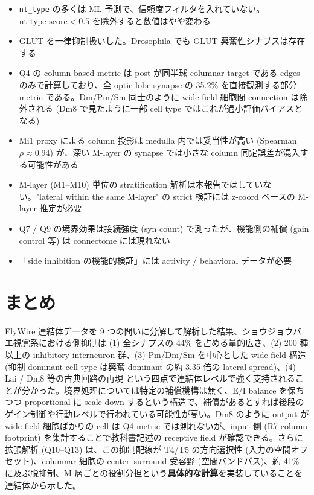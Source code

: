 \documentclass[11pt,a4paper]{ltjsarticle}
\begin{document}
\begin{itemize}
\item \texttt{nt\_type} の多くは ML 予測で、信頼度フィルタを入れていない。$\text{nt\_type\_score} < 0.5$ を除外すると数値はやや変わる
\item GLUT を一律抑制扱いした。Drosophila でも GLUT 興奮性シナプスは存在する
\item Q4 の column-based metric は post が同半球 columnar target である edges のみで計算しており、全 optic-lobe synapse の 35.2\% を直接観測する部分 metric である。Dm/Pm/Sm 同士のように wide-field 細胞間 connection は除外される (Dm8 で見たように一部 cell type ではこれが過小評価バイアスとなる)
\item Mi1 proxy による column 投影は medulla 内では妥当性が高い (Spearman $\rho \approx 0.94$) が、深い M-layer の synapse では小さな column 同定誤差が混入する可能性がある
\item M-layer (M1--M10) 単位の stratification 解析は本報告ではしていない。"lateral within the same M-layer" の strict 検証には z-coord ベースの M-layer 推定が必要
\item Q7 / Q9 の境界効果は接続強度 (syn count) で測ったが、機能側の補償 (gain control 等) は connectome には現れない
\item 「side inhibition の機能的検証」には activity / behavioral データが必要
\end{itemize}

\section{まとめ}

FlyWire 連結体データを 9 つの問いに分解して解析した結果、ショウジョウバエ視覚系における側抑制は (1) 全シナプスの 44\% を占める量的広さ、(2) 200 種以上の inhibitory interneuron 群、(3) Pm/Dm/Sm を中心とした wide-field 構造 (抑制 dominant cell type は興奮 dominant の約 3.35 倍の lateral spread)、(4) Lai / Dm8 等の古典回路の再現 という四点で連結体レベルで強く支持されることが分かった。境界処理については特定の補償機構は無く、E/I balance を保ちつつ proportional に scale down するという構造で、補償があるとすれば後段のゲイン制御や行動レベルで行われている可能性が高い。Dm8 のように output が wide-field 細胞ばかりの cell は Q4 metric では測れないが、input 側 (R7 column footprint) を集計することで教科書記述の receptive field が確認できる。さらに拡張解析 (Q10--Q13) は、この抑制配線が T4/T5 の方向選択性 (入力の空間オフセット)、columnar 細胞の center--surround 受容野 (空間バンドパス)、約 41\% に及ぶ脱抑制、M 層ごとの役割分担という\textbf{具体的な計算}を実装していることを連結体から示した。
\end{document}
